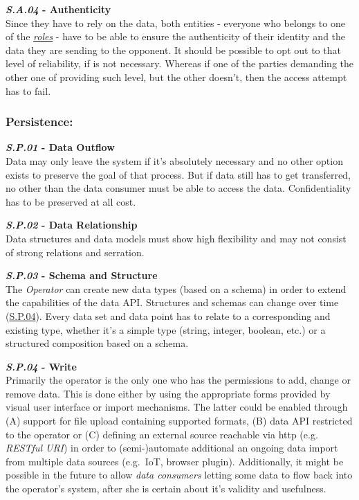\documentclass[12pt,english,a4paper,titlepage,cleardoublepage=empty,dottedtoc]{report}
\begin{document}
\textbf{\emph{\protect\hypertarget{sa04}{}{S.A.04}} - Authenticity}\\
Since they have to rely on the data, both entities - everyone who
belongs to one of the \emph{\protect\hyperlink{sa03}{roles}} - have to
be able to ensure the authenticity of their identity and the data they
are sending to the opponent. It should be possible to opt out to that
level of reliability, if is not necessary. Whereas if one of the parties
demanding the other one of providing such level, but the other doesn't,
then the access attempt has to fail.

\subsubsection{Persistence:}\label{persistence}

\textbf{\emph{\protect\hypertarget{sp01}{}{S.P.01}} - Data Outflow}\\
Data may only leave the system if it's absolutely necessary and no other
option exists to preserve the goal of that process. But if data still
has to get transferred, no other than the data consumer must be able to
access the data. Confidentiality has to be preserved at all cost.

\textbf{\emph{\protect\hypertarget{sp02}{}{S.P.02}} - Data
Relationship}\\
Data structures and data models must show high flexibility and may not
consist of strong relations and serration.

\textbf{\emph{\protect\hypertarget{sp03}{}{S.P.03}} - Schema and
Structure}\\
The \emph{Operator} can create new data types (based on a schema) in
order to extend the capabilities of the data API. Structures and schemas
can change over time (\protect\hyperlink{sp04}{S.P.04}). Every data set
and data point has to relate to a corresponding and existing type,
whether it's a simple type (string, integer, boolean, etc.) or a
structured composition based on a schema.

\textbf{\emph{\protect\hypertarget{sp04}{}{S.P.04}} - Write}\\
Primarily the operator is the only one who has the permissions to add,
change or remove data. This is done either by using the appropriate
forms provided by visual user interface or import mechanisms. The latter
could be enabled through (A) support for file upload containing
supported formats, (B) data API restricted to the operator or (C)
defining an external source reachable via http (e.g. \emph{RESTful URI})
in order to (semi-)automate additional an ongoing data import from
multiple data sources (e.g.~IoT, browser plugin). Additionally, it might
be possible in the future to allow \emph{data consumers} letting some
data to flow back into the operator's system, after she is certain about
it's validity and usefulness.
\end{document}

